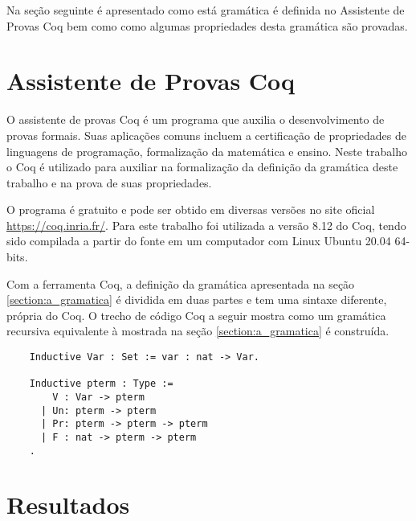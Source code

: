 \documentclass{article}
\begin{document}
Na seção seguinte é apresentado como está gramática é definida no Assistente de Provas Coq bem como como algumas propriedades desta gramática são provadas.

\section{Assistente de Provas Coq}
\label{section:assistente_coq}

O assistente de provas Coq é um programa que auxilia o desenvolvimento de provas formais. Suas
aplicações comuns incluem a certificação de propriedades de linguagens de programação, %
formalização da matemática e ensino. Neste trabalho o Coq é utilizado para auxiliar na formalização da
definição da gramática deste trabalho e na prova de suas propriedades.

O programa é gratuito e pode ser obtido em diversas versões no site oficial
\url{https://coq.inria.fr/}. Para este trabalho foi utilizada a versão 8.12 do Coq, tendo sido
compilada a partir do fonte em um computador com Linux Ubuntu 20.04 64-bits.

Com a ferramenta Coq, a definição da gramática apresentada na seção \ref{section:a_gramatica} é
dividida em duas partes e tem uma sintaxe diferente, própria do Coq. O trecho de código Coq a seguir
mostra como um gramática recursiva equivalente à mostrada na seção \ref{section:a_gramatica} é
construída.

\begin{verbatim}
	Inductive Var : Set := var : nat -> Var.

	Inductive pterm : Type :=
		V : Var -> pterm
	  | Un: pterm -> pterm
	  | Pr: pterm -> pterm -> pterm
	  | F : nat -> pterm -> pterm
	.
\end{verbatim}

\section{Resultados}
\label{section:resultados}
\end{document}
